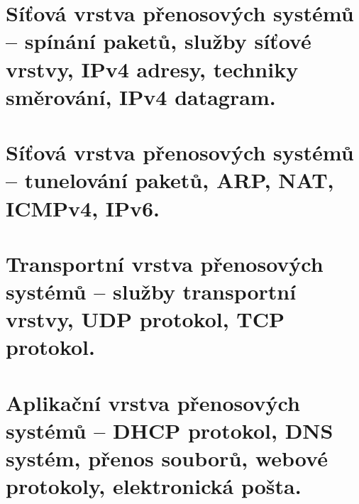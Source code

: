 \clearpage
\section{Síťová vrstva přenosových systémů -- spínání paketů, služby síťové vrstvy, IPv4 adresy, techniky směrování, IPv4 datagram.}

\clearpage
\section{Síťová vrstva přenosových systémů -- tunelování paketů, ARP, NAT, ICMPv4, IPv6.}

\clearpage
\section{Transportní vrstva přenosových systémů -- služby transportní vrstvy, UDP protokol, TCP protokol.}

\clearpage
\section{Aplikační vrstva přenosových systémů -- DHCP protokol, DNS systém, přenos souborů, webové protokoly, elektronická pošta.}
